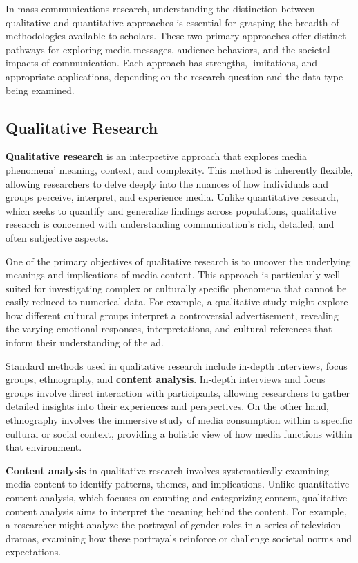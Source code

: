 \documentclass[
]{book}
\begin{document}
In mass communications research, understanding the distinction between qualitative and quantitative approaches is essential for grasping the breadth of methodologies available to scholars. These two primary approaches offer distinct pathways for exploring media messages, audience behaviors, and the societal impacts of communication. Each approach has strengths, limitations, and appropriate applications, depending on the research question and the data type being examined.

\subsection*{Qualitative Research}\label{qualitative-research}

\textbf{Qualitative research} is an interpretive approach that explores media phenomena' meaning, context, and complexity. This method is inherently flexible, allowing researchers to delve deeply into the nuances of how individuals and groups perceive, interpret, and experience media. Unlike quantitative research, which seeks to quantify and generalize findings across populations, qualitative research is concerned with understanding communication's rich, detailed, and often subjective aspects.

One of the primary objectives of qualitative research is to uncover the underlying meanings and implications of media content. This approach is particularly well-suited for investigating complex or culturally specific phenomena that cannot be easily reduced to numerical data. For example, a qualitative study might explore how different cultural groups interpret a controversial advertisement, revealing the varying emotional responses, interpretations, and cultural references that inform their understanding of the ad.

Standard methods used in qualitative research include in-depth interviews, focus groups, ethnography, and \textbf{content analysis}. In-depth interviews and focus groups involve direct interaction with participants, allowing researchers to gather detailed insights into their experiences and perspectives. On the other hand, ethnography involves the immersive study of media consumption within a specific cultural or social context, providing a holistic view of how media functions within that environment.

\textbf{Content analysis} in qualitative research involves systematically examining media content to identify patterns, themes, and implications. Unlike quantitative content analysis, which focuses on counting and categorizing content, qualitative content analysis aims to interpret the meaning behind the content. For example, a researcher might analyze the portrayal of gender roles in a series of television dramas, examining how these portrayals reinforce or challenge societal norms and expectations.
\end{document}
